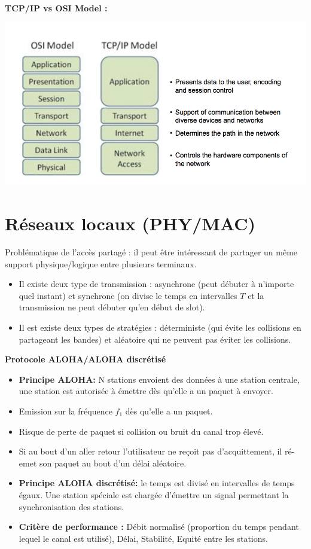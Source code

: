 \documentclass[a4paper,9pt, twocolumn]{article}
\begin{document}
\textbf{TCP/IP vs OSI Model :
}
\begin{center}
\includegraphics[scale=0.4]{TCP.png}
\end{center}
\section*{Réseaux locaux (PHY/MAC)}
Problématique de l'accès partagé : il peut être intéressant de partager un même support physique/logique entre plusieurs terminaux. 
\begin{itemize}
\item Il existe deux type de transmission : asynchrone (peut débuter à n'importe quel instant) et synchrone (on divise le temps en intervalles $T$ et la transmission ne peut débuter qu'en début de slot).
\item Il est existe deux types de stratégies : déterministe (qui évite les collisions en partageant les bandes) et aléatoire qui ne peuvent pas éviter les collisions.
\end{itemize}

\textbf{Protocole ALOHA/ALOHA discrétisé}
\begin{itemize}
\item \textbf{Principe ALOHA:} N stations envoient des données à une station centrale, une station est autorisée à émettre dès qu'elle a un paquet à envoyer.
\item Emission sur la fréquence $f_{1}$ dès qu'elle a un paquet.
\item Risque de perte de paquet si collision ou bruit du canal trop élevé.
\item Si au bout d'un aller retour l'utilisateur ne reçoit pas d'acquittement, il ré-emet son paquet au bout d'un délai aléatoire.
\item \textbf{Principe ALOHA discrétisé: } le temps est divisé en intervalles de temps égaux. Une station spéciale est chargée d'émettre un signal permettant la synchronisation des stations.
\item \textbf{Critère de performance :} Débit normalisé (proportion du temps pendant lequel le canal est utilisé), Délai, Stabilité, Equité entre les stations.
\end{itemize}
\end{document}
